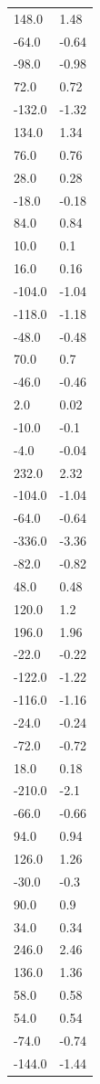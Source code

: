 \begin{longtable}{ll}
148.0 & 1.48 \\
-64.0 & -0.64 \\
-98.0 & -0.98 \\
72.0 & 0.72 \\
-132.0 & -1.32 \\
134.0 & 1.34 \\
76.0 & 0.76 \\
28.0 & 0.28 \\
-18.0 & -0.18 \\
84.0 & 0.84 \\
10.0 & 0.1 \\
16.0 & 0.16 \\
-104.0 & -1.04 \\
-118.0 & -1.18 \\
-48.0 & -0.48 \\
70.0 & 0.7 \\
-46.0 & -0.46 \\
2.0 & 0.02 \\
-10.0 & -0.1 \\
-4.0 & -0.04 \\
232.0 & 2.32 \\
-104.0 & -1.04 \\
-64.0 & -0.64 \\
-336.0 & -3.36 \\
-82.0 & -0.82 \\
48.0 & 0.48 \\
120.0 & 1.2 \\
196.0 & 1.96 \\
-22.0 & -0.22 \\
-122.0 & -1.22 \\
-116.0 & -1.16 \\
-24.0 & -0.24 \\
-72.0 & -0.72 \\
18.0 & 0.18 \\
-210.0 & -2.1 \\
-66.0 & -0.66 \\
94.0 & 0.94 \\
126.0 & 1.26 \\
-30.0 & -0.3 \\
90.0 & 0.9 \\
34.0 & 0.34 \\
246.0 & 2.46 \\
136.0 & 1.36 \\
58.0 & 0.58 \\
54.0 & 0.54 \\
-74.0 & -0.74 \\
-144.0 & -1.44 \\

\end{longtable}
